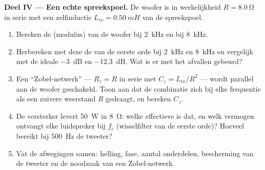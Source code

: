 \begin{problem}
\medskip
\noindent\textbf{Deel IV --- Een echte spreekspoel.}
De woofer is in werkelijkheid $R = \qty{8.0}{\ohm}$ in serie met een zelfinductie
$L_{vc} = \qty{0.50}{mH}$ van de spreekspoel.
\begin{enumerate}[resume]
  \item Bereken de  (modulus) van de woofer bij \qty{2}{kHz} en bij
        \qty{8}{kHz}.
  \item Herbereken met deze  de  van de eerste orde bij
        \qty{2}{kHz} en \qty{8}{kHz} en vergelijk met de ideale
        \qty{-3}{dB} en \qty{-12.3}{dB}. Wat is er met het afvallen gebeurd?
  \item Een ``Zobel-netwerk'' --- $R_z = R$ in serie met $C_z =
        L_{vc}/R^2$ --- wordt parallel aan de woofer geschakeld. Toon aan
        dat de combinatie zich bij elke frequentie als een zuivere weerstand $R$
        gedraagt, en bereken $C_z$.
  \item De versterker levert \qty{50}{W} in \qty{8}{\ohm}: welke effectieve
         is dat, en welk vermogen ontvangt elke luidspreker bij
        $f_c$ (wisselfilter van de eerste orde)? Hoeveel bereikt bij \qty{500}{Hz}
        de tweeter?
  \item Vat de afwegingen samen: helling, fase, aantal onderdelen,
        bescherming van de tweeter en de noodzaak van een Zobel-netwerk.
\end{enumerate}
\end{problem}
